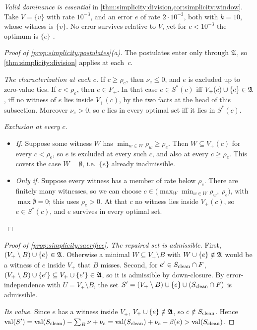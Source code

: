 \emph{Valid dominance is essential} in \cref{thm:simplicity:division,cor:simplicity:window}. Take $V=\{v\}$ with rate $10^{-3}$, and an error $e$ of rate $2\cdot10^{-3}$, both with $k=10$, whose witness is $\{v\}$. No error survives relative to $V$, yet for $c<10^{-3}$ the optimum is $\{e\}$ .

\begin{proof}[Proof of \cref{prop:simplicity:postulates}(a)]
The postulates enter only through $\mathfrak A$, so \cref{thm:simplicity:division} applies at each~$c$.

\emph{The characterization at each $c$.} If $c\ge\rho_e$, then $\nu_e\le0$, and $e$ is excluded up to zero-value ties. If $c<\rho_e$, then $e\in F_+$. In that case $e\in S^*(c)$ iff $V_+(c)\cup\{e\}\in\mathfrak A$, iff no witness of $e$ lies inside $V_+(c)$, by the two facts at the head of this subsection. Moreover $\nu_e>0$, so $e$ lies in every optimal set iff it lies in $S^*(c)$.

\emph{Exclusion at every $c$.}
\begin{itemize}
\item \emph{If.} Suppose some witness $W$ has $\min_{w\in W}\rho_w\ge\rho_e$. Then $W\subseteq V_+(c)$ for every $c<\rho_e$, so $e$ is excluded at every such $c$, and also at every $c\ge\rho_e$. This covers the case $W=\emptyset$, i.e.\ $\{e\}$ already inadmissible.
\item \emph{Only if.} Suppose every witness has a member of rate below $\rho_e$. There are finitely many witnesses, so we can choose $c\in\big(\max_W\min_{w\in W}\rho_w,\ \rho_e\big)$, with $\max\emptyset=0$; this uses $\rho_e>0$. At that $c$ no witness lies inside $V_+(c)$, so $e\in S^*(c)$, and $e$ survives in every optimal set.
\end{itemize}
\end{proof}

\begin{proof}[Proof of \cref{prop:simplicity:sacrifice}]
\emph{The repaired set is admissible.} First, $(V_+\setminus B)\cup\{e\}\in\mathfrak A$. Otherwise a minimal $W\subseteq V_+\setminus B$ with $W\cup\{e\}\notin\mathfrak A$ would be a witness of $e$ inside $V_+$ that $B$ misses. Second, for $e'\in S_{\rm clean}\cap F$, $(V_+\setminus B)\cup\{e'\}\subseteq V_+\cup\{e'\}\in\mathfrak A$, so it is admissible by down-closure. By error-independence with $U=V_+\setminus B$, the set $S'=(V_+\setminus B)\cup\{e\}\cup(S_{\rm clean}\cap F)$ is admissible.

\emph{Its value.} Since $e$ has a witness inside $V_+$, $V_+\cup\{e\}\notin\mathfrak A$, so $e\notin S_{\rm clean}$. Hence $\mathrm{val}(S')=\mathrm{val}(S_{\rm clean})-\sum_B\nu+\nu_e=\mathrm{val}(S_{\rm clean})+\nu_e-\beta(e)>\mathrm{val}(S_{\rm clean})$.
\end{proof}

